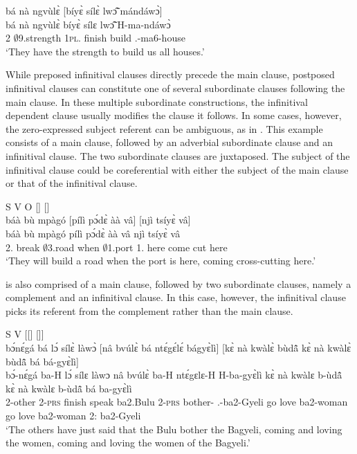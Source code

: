 \ea\label{INFpost2}
  \glll bá nà ngvùlɛ̀ [bíyɛ̀ sílɛ̀ lwɔ̃̂ mándáwɔ̀]\textsubscript{{\SUB}}\\
        bá nà ngvùlɛ̀ {\db}bíyɛ̀ sílɛ lwɔ̃̂ H-ma-ndáwɔ̀ \\
        2 {\COM}  $\emptyset$9.strength {\db}1\textsc{pl}.{\OBJ} finish build {\OBJ}.{\LINK}-ma6-house \\
    \trans `They have the strength to build us all houses.'
\z

While preposed infinitival clauses directly precede the main clause, postposed infinitival clauses can constitute one of several subordinate clauses following the main clause. In these multiple subordinate constructions, the infinitival dependent clause usually modifies the clause it follows. In some cases, however, the zero-expressed subject referent can be ambiguous, as in . This example consists of a main clause, followed by an adverbial subordinate clause and an infinitival clause. The two subordinate clauses are juxtaposed. The subject of the infinitival clause could be coreferential with either the subject of the main clause or that of the infinitival clause.


\ea\label{INFpost3} S V O [{\ADV}] [{\INF}]\\
  \glll báà bù mpàgó [pílì pɔ́dɛ̀ àà vâ]\textsubscript{{\ADV}} [njì tsíyɛ̀ vâ]\textsubscript{{\SUB}}\\
      báà bù mpàgó {\db}pílì pɔ́dɛ̀ àà vâ {\db}njì tsíyɛ̀ vâ\\
         2.{\FUT} break $\emptyset$3.road {\db}when $\emptyset$1.port 1.{\COP} here {\db}come cut here\\
    \trans `They will build a road when the port is here, coming cross-cutting here.'
\z

 is also comprised of a main clause, followed by two subordinate clauses, namely a complement and an infinitival clause. In this case, however, the infinitival clause picks its referent from the complement rather than the main clause.


\ea\label{INFpost4} S V [[{\COMP}] [{\INF}]]\\
  \glll bɔ́nɛ́gá bá lɔ́ sílɛ̀ làwɔ̀ [nâ bvúlɛ̀ bá ntɛ́gɛ́lɛ́ bágyɛ̀lì]\textsubscript{{\COMP}} [kɛ̀ nà kwàlɛ̀ bùdã̂ kɛ̀ nà kwàlɛ̀ bùdã̂ bá bá-gyɛ̀lì]\textsubscript{{\SUB}} \\
      bɔ́-nɛ́gá ba-H lɔ́ sílɛ làwɔ {\db}nâ bvúlɛ̀ ba-H ntɛ́gɛlɛ-H H-ba-gyɛ̀lì kɛ̀ nà kwàlɛ b-ùdã̂ {\db}kɛ̀ nà kwàlɛ b-ùdã̂ bá ba-gyɛ̀lì \\
        2-other 2-\textsc{prs} {\RETRO}  finish speak {\db}{\COMP} ba2.Bulu 2-\textsc{prs} bother-{\R} {\OBJ}.{\LINK}-ba2-Gyeli {\db}go {\COM} love ba2-woman go {\COM} love ba2-woman  2:{\ATT} ba2-Gyeli\\
    \trans `The others have just said that the Bulu bother the Bagyeli, coming and loving the women, coming and loving the women of the Bagyeli.'
\z


